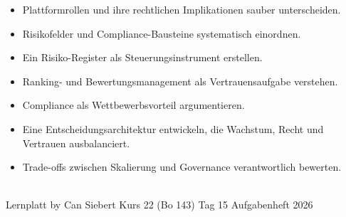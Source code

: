 \documentclass[11pt,a4paper,oneside]{article}
\begin{document}
\medskip
\begin{infobox}
\begin{itemize}
  \item Plattformrollen und ihre rechtlichen Implikationen sauber unterscheiden.
  \item Risikofelder und Compliance-Bausteine systematisch einordnen.
  \item Ein Risiko-Register als Steuerungsinstrument erstellen.
  \item Ranking- und Bewertungsmanagement als Vertrauensaufgabe verstehen.
  \item Compliance als Wettbewerbsvorteil argumentieren.
  \item Eine Entscheidungsarchitektur entwickeln, die Wachstum, Recht und Vertrauen ausbalanciert.
  \item Trade-offs zwischen Skalierung und Governance verantwortlich bewerten.
\end{itemize}
\end{infobox}

\vspace{1cm}
\noindent{\color{lpAccent}\rule{\linewidth}{0.6pt}}\\[4pt]
{\footnotesize\sffamily\color{lpGray}Lernplatt \textperiodcentered{} by Can Siebert \textperiodcentered{} Kurs 22 (Bo 143) \textperiodcentered{} Tag 15 \textperiodcentered{} Aufgabenheft \textperiodcentered{} \textcopyright{} 2026}
\end{document}

